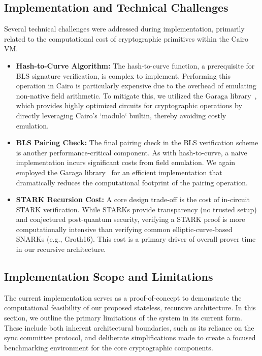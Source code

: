 \documentclass[runningheads]{llncs}
\begin{document}
\subsection{Implementation and Technical Challenges}
Several technical challenges were addressed during implementation, primarily related to the computational cost of cryptographic primitives within the Cairo VM.
\begin{itemize}
    \item \textbf{Hash-to-Curve Algorithm:} The hash-to-curve function, a prerequisite for BLS signature verification, is complex to implement. Performing this operation in Cairo is particularly expensive due to the overhead of emulating non-native field arithmetic. To mitigate this, we utilized the Garaga library~\cite{Prime2025Garaga}, which provides highly optimized circuits for cryptographic operations by directly leveraging Cairo's `modulo` builtin, thereby avoiding costly emulation.

    \item \textbf{BLS Pairing Check:} The final pairing check in the BLS verification scheme is another performance-critical component. As with hash-to-curve, a naive implementation incurs significant costs from field emulation. We again employed the Garaga library~\cite{Prime2025Garaga} for an efficient implementation that dramatically reduces the computational footprint of the pairing operation.
    
    \item \textbf{STARK Recursion Cost:} A core design trade-off is the cost of in-circuit STARK verification. While STARKs provide transparency (no trusted setup) and conjectured post-quantum security, verifying a STARK proof is more computationally intensive than verifying common elliptic-curve-based SNARKs (e.g., Groth16). This cost is a primary driver of overall prover time in our recursive architecture.
\end{itemize}

\subsection{Implementation Scope and Limitations}
The current implementation serves as a proof-of-concept to demonstrate the computational feasibility of our proposed stateless, recursive architecture. In this section, we outline the primary limitations of the system in its current form. These include both inherent architectural boundaries, such as its reliance on the sync committee protocol, and deliberate simplifications made to create a focused benchmarking environment for the core cryptographic components.
\end{document}
